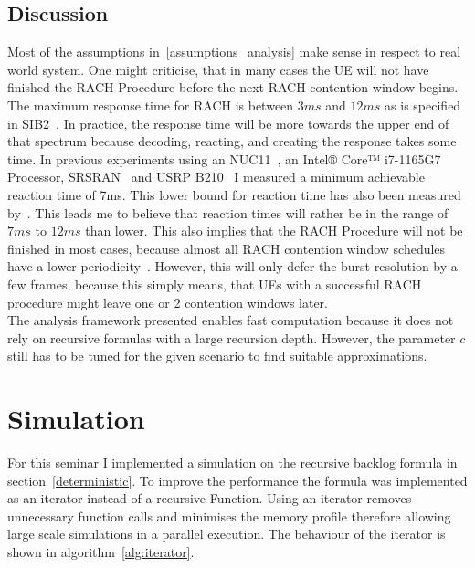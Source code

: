 \documentclass[conference]{IEEEtran}
\begin{document}
\subsection{Discussion}
Most of the assumptions in~\ref{assumptions_analysis} make sense in respect to real world system.
One might criticise, that in many cases the UE will not have finished the RACH Procedure before the next RACH contention window begins.
The maximum response time for RACH is between $3ms$ and $12ms$ as is specified in SIB2~\cite{ETSI_TS_138_211}.
In practice, the response time will be more towards the upper end of that spectrum because decoding, reacting, and creating the response takes some time.
In previous experiments using an NUC11~\cite{NUC}, an Intel® Core™ i7-1165G7 Processor, SRSRAN~\cite{srsRAN} and USRP B210~\cite{B210} I measured a minimum achievable reaction time of 7ms.
This lower bound for reaction time has also been measured by~\cite{Masterarbeit}.
This leads me to believe that reaction times will rather be in the range of $7ms$ to $12ms$ than lower.
This also implies that the RACH Procedure will not be finished in most cases, because almost all RACH contention window schedules have a lower periodicity~\cite{ETSI_TS_138_211}.
However, this will only defer the burst resolution by a few frames, because this simply means, that UEs with a successful RACH procedure might leave one or 2 contention windows later.\\
The analysis framework presented enables fast computation because it does not rely on recursive formulas with a large recursion depth.
However, the parameter $c$ still has to be tuned for the given scenario to find suitable approximations.
\section{Simulation}
For this seminar I implemented a simulation on the recursive backlog formula in section~\ref{deterministic}.
To improve the performance the formula was implemented as an iterator instead of a recursive Function.
Using an iterator removes unnecessary function calls and minimises the memory profile therefore allowing large scale simulations in a parallel execution.
The behaviour of the iterator is shown in algorithm~\ref{alg:iterator}.\\\\
\end{document}

